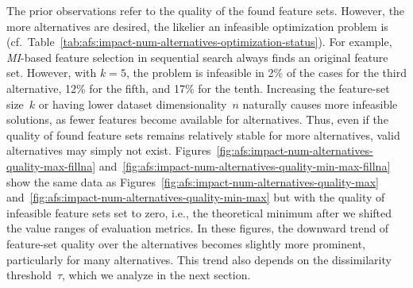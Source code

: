 \documentclass{article}
\theoremstyle{definition}
\begin{document}
The prior observations refer to the quality of the found feature sets.
However, the more alternatives are desired, the likelier an infeasible optimization problem is (cf.~Table~\ref{tab:afs:impact-num-alternatives-optimization-status}).
For example, \emph{MI}-based feature selection in sequential search always finds an original feature set.
However, with $k=5$, the problem is infeasible in 2\% of the cases for the third alternative, 12\% for the fifth, and 17\% for the tenth.
Increasing the feature-set size~$k$ or having lower dataset dimensionality~$n$ naturally causes more infeasible solutions, as fewer features become available for alternatives.
Thus, even if the quality of found feature sets remains relatively stable for more alternatives, valid alternatives may simply not exist.
Figures~\ref{fig:afs:impact-num-alternatives-quality-max-fillna} and~\ref{fig:afs:impact-num-alternatives-quality-min-max-fillna} show the same data as Figures~\ref{fig:afs:impact-num-alternatives-quality-max} and~\ref{fig:afs:impact-num-alternatives-quality-min-max} but with the quality of infeasible feature sets set to zero, i.e., the theoretical minimum after we shifted the value ranges of evaluation metrics.
In these figures, the downward trend of feature-set quality over the alternatives becomes slightly more prominent, particularly for many alternatives.
This trend also depends on the dissimilarity threshold~$\tau$, which we analyze in the next section.
\end{document}
